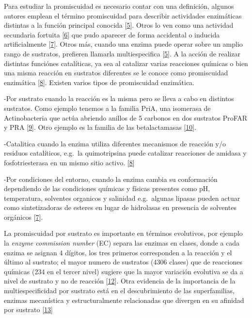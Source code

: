 \documentclass[12pt,twoside]{reedthesis}
\begin{document}
  Para estudiar la promiscuidad es necesario contar con una definición,
  algunos autores emplean el término promiscuidad para describir
  actividades enzimáticas distintas a la función principal conocida
  {[}\protect\hyperlink{ref-khersonsky_enzyme_2010}{5}{]}. Otros lo ven
  como una actividad secundaria fortuita
  {[}\protect\hyperlink{ref-copley_enzymes_2003}{6}{]} que pudo aparecer
  de forma accidental o inducida artificialmente
  {[}\protect\hyperlink{ref-hult_enzyme_2007}{7}{]}. Otros más, cuando una
  enzima puede operar sobre un amplio rango de sustratos, prefieren
  llamarla multiespecifica
  {[}\protect\hyperlink{ref-khersonsky_enzyme_2010}{5}{]}. A la acción de
  realizar distintas funciónes catalíticas, ya sea al catalizar varias
  reacciones químicas o bien una misma reacción en sustratos diferentes se
  le conoce como promiscuidad enzimática
  {[}\protect\hyperlink{ref-obrien_catalytic_1999}{8}{]}. Existen varios
  tipos de promiscuidad enzimática.
  
  -Por sustrato cuando la reacción es la misma pero se lleva a cabo en
  distintos sustratos. Como ejemplo tenemos a la familia PriA, una
  isomerasa de Actinobacteria que actúa abriendo anillos de 5 carbonos en
  dos sustratos ProFAR y PRA
  {[}\protect\hyperlink{ref-baronagomez_occurrence_2003}{9}{]}. Otro
  ejemplo es la familia de las betalactamasas
  {[}\protect\hyperlink{ref-risso_phenotypic_2014}{10}{]}.
  
  -Catalitica cuando la enzima utiliza diferentes mecanismos de reacción
  y/o residuos catalíticos, e.g.~la quimotripsina puede catalizar
  reacciones de amidasa y fosfotriesterasa en un mismo sitio activo.
  {[}\protect\hyperlink{ref-obrien_catalytic_1999}{8}{]}
  
  -Por condiciones del entorno, cuando la enzima cambia su conformación
  dependiendo de las condiciones químicas y físicas presentes como pH,
  temperatura, solventes organicos y salinidad e.g.~algunas lipasas pueden
  actuar como sintetizadoras de esteres en lugar de hidrolasas en
  presencia de solventes orgánicos
  {[}\protect\hyperlink{ref-hult_enzyme_2007}{7}{]}.
  
  La promiscuidad por sustrato es importante en términos evolutivos, por
  ejemplo la \emph{enzyme commission number} (EC) separa las enzimas en
  clases, donde a cada enzima se asignan 4 dígitos, los tres primeros
  corresponden a la reacción y el último al sustrato; el mayor numero de
  sustratos (4306 clases) que de reacciones químicas (234 en el tercer
  nivel) sugiere que la mayor variación evolutiva se da a nivel de
  sustrato y no de reacción
  {[}\protect\hyperlink{ref-li_computational_2004}{12}{]}. Otra evidencia
  de la importancia de la multiespecificidad por sustrato está en el
  descubrimiento de las superfamilias, enzimas mecanística y
  estructuralmente relacionadas que divergen en su afinidad por sustrato
  {[}\protect\hyperlink{ref-glasner_evolution_2006}{13}{]}
  
\end{document}
